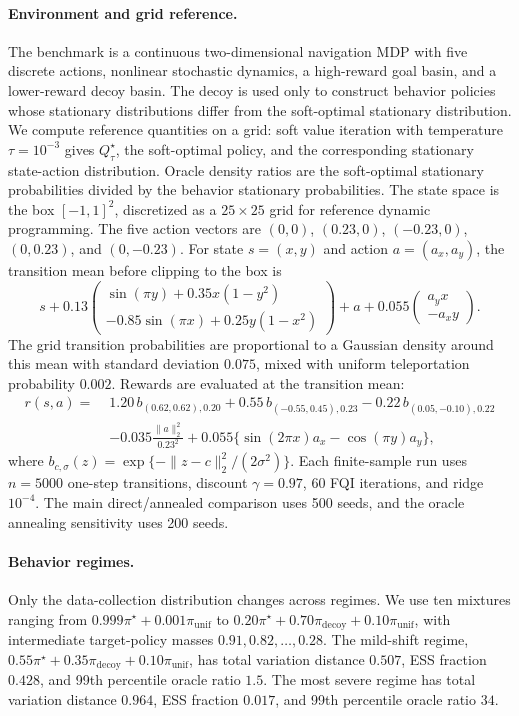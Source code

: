 \documentclass{article}
\theoremstyle{plain}
\theoremstyle{definition}
\theoremstyle{remark}
\begin{document}
\paragraph{Environment and grid reference.}
The benchmark is a continuous two-dimensional navigation MDP with five
discrete actions, nonlinear stochastic dynamics, a high-reward goal basin, and
a lower-reward decoy basin. The decoy is used only to construct behavior
policies whose stationary distributions differ from the soft-optimal stationary
distribution. We compute reference quantities on a grid: soft value iteration
with temperature \(\tau=10^{-3}\) gives \(Q^\star_\tau\), the soft-optimal
policy, and the corresponding stationary state-action distribution. Oracle
density ratios are the soft-optimal stationary probabilities divided by the
behavior stationary probabilities.
The state space is the box \([-1,1]^2\), discretized as a \(25\times25\) grid
for reference dynamic programming. The five action vectors are
\((0,0)\), \((0.23,0)\), \((-0.23,0)\), \((0,0.23)\), and \((0,-0.23)\). For
state \(s=(x,y)\) and action \(a=(a_x,a_y)\), the transition mean before
clipping to the box is
\[
s
+0.13
\begin{pmatrix}
\sin(\pi y)+0.35x(1-y^2)\\
-0.85\sin(\pi x)+0.25y(1-x^2)
\end{pmatrix}
+a
+0.055
\begin{pmatrix}
a_y x\\
-a_x y
\end{pmatrix}.
\]
The grid transition probabilities are proportional to a Gaussian density around
this mean with standard deviation \(0.075\), mixed with uniform teleportation
probability \(0.002\). Rewards are evaluated at the transition mean:
\[
\begin{aligned}
r(s,a)
=\;&1.20\,b_{(0.62,0.62),0.20}
+0.55\,b_{(-0.55,0.45),0.23}
-0.22\,b_{(0.05,-0.10),0.22}
\\
&-0.035\frac{\|a\|_2^2}{0.23^2}
+0.055\{\sin(2\pi x)a_x-\cos(\pi y)a_y\},
\end{aligned}
\]
where \(b_{c,\sigma}(z)=\exp\{-\|z-c\|_2^2/(2\sigma^2)\}\). Each finite-sample
run uses \(n=5000\) one-step transitions, discount \(\gamma=0.97\), 60 FQI
iterations, and ridge \(10^{-4}\). The main direct/annealed comparison uses 500
seeds, and the oracle annealing sensitivity uses 200 seeds.

\paragraph{Behavior regimes.}
Only the data-collection distribution changes across regimes. We use ten
mixtures ranging from
\(0.999\pi^\star+0.001\pi_{\mathrm{unif}}\) to
\(0.20\pi^\star+0.70\pi_{\mathrm{decoy}}+0.10\pi_{\mathrm{unif}}\), with
intermediate target-policy masses \(0.91,0.82,\ldots,0.28\). The mild-shift
regime,
\(0.55\pi^\star+0.35\pi_{\mathrm{decoy}}+0.10\pi_{\mathrm{unif}}\), has total
variation distance \(0.507\), ESS fraction \(0.428\), and 99th percentile
oracle ratio \(1.5\). The most severe regime has total variation distance
\(0.964\), ESS fraction \(0.017\), and 99th percentile oracle ratio \(34\).
\end{document}
